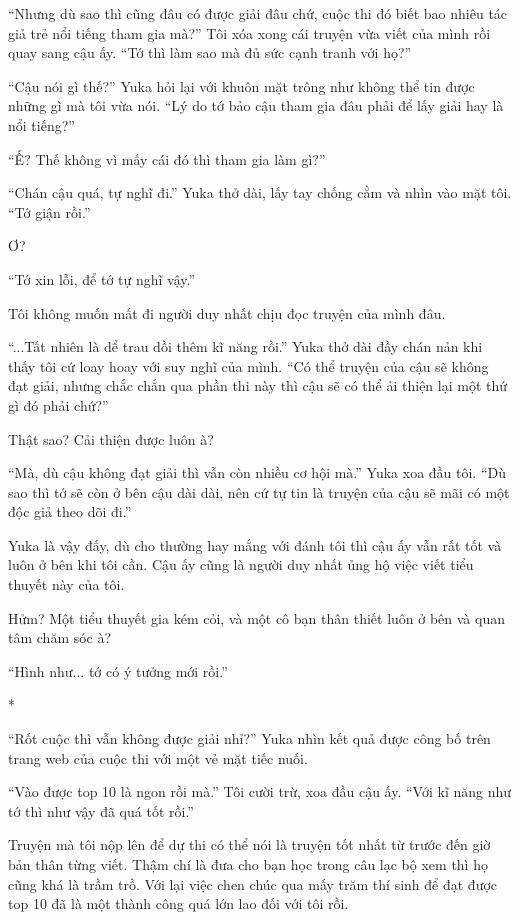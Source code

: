 {``Nhưng dù sao thì cũng đâu có được giải đâu chứ, cuộc thi đó biết bao
nhiêu tác giả trẻ nổi tiếng tham gia mà?'' Tôi xóa xong cái truyện vừa
viết của mình rồi quay sang cậu ấy. ``Tớ thì làm sao mà đủ sức cạnh
tranh với họ?''

``Cậu nói gì thế?'' Yuka hỏi lại với khuôn mặt trông như không thể tin
được những gì mà tôi vừa nói. ``Lý do tớ bảo cậu tham gia đâu phải để
lấy giải hay là nổi tiếng?''

``Ế? Thế không vì mấy cái đó thì tham gia làm gì?''

``Chán cậu quá, tự nghĩ đi.'' Yuka thở dài, lấy tay chống cằm và nhìn
vào mặt tôi. ``Tớ giận rồi.''

Ơ?

``Tớ xin lỗi, để tớ tự nghĩ vậy.''

Tôi không muốn mất đi người duy nhất chịu đọc truyện của mình đâu.

``...Tất nhiên là dể trau dồi thêm kĩ năng rồi.'' Yuka thở dài đầy chán
nản khi thấy tôi cứ loay hoay với suy nghĩ của mình. ``Có thể truyện của
cậu sẽ không đạt giải, nhưng chắc chắn qua phần thi này thì cậu sẽ có
thể ải thiện lại một thứ gì đó phải chứ?''

Thật sao? Cải thiện được luôn à?

``Mà, dù cậu không đạt giải thì vẫn còn nhiều cơ hội mà.'' Yuka xoa đầu
tôi. ``Dù sao thì tớ sẽ còn ở bên cậu dài dài, nên cứ tự tin là truyện
của cậu sẽ mãi có một độc giả theo dõi đi.''

Yuka là vậy đấy, dù cho thường hay mắng với đánh tôi thì cậu ấy vẫn rất
tốt và luôn ở bên khi tôi cần. Cậu ấy cũng là người duy nhất ủng hộ việc
viết tiểu thuyết này của tôi.

Hửm? Một tiểu thuyết gia kém cỏi, và một cô bạn thân thiết luôn ở bên và
quan tâm chăm sóc à?

``Hình như... tớ có ý tưởng mới rồi.''

*

``Rốt cuộc thì vẫn không được giải nhỉ?'' Yuka nhìn kết quả được công bố
trên trang web của cuộc thi với một vẻ mặt tiếc nuối.

``Vào được top 10 là ngon rồi mà.'' Tôi cười trừ, xoa đầu cậu ấy. ``Với
kĩ năng như tớ thì như vậy đã quá tốt rồi.''

Truyện mà tôi nộp lên để dự thi có thể nói là truyện tốt nhất từ trước
đến giờ bản thân từng viết. Thậm chí là đưa cho bạn học trong câu lạc bộ
xem thì họ cũng khá là trầm trồ. Với lại việc chen chúc qua mấy trăm thí
sinh để đạt được top 10 đã là một thành công quá lớn lao đối với tôi
rồi.

}
